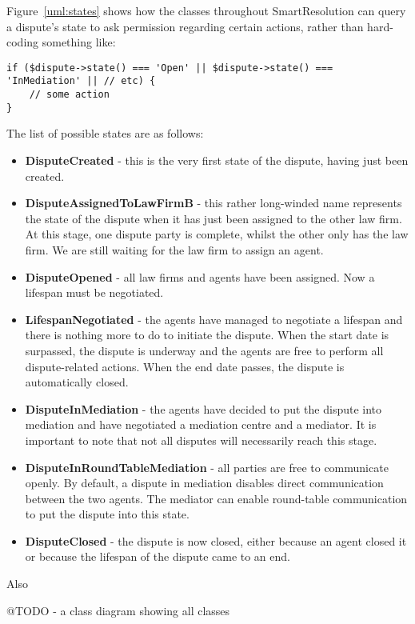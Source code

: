 Figure~\ref{uml:states} shows how the classes throughout SmartResolution can query a dispute's state to ask permission regarding certain actions, rather than hard-coding something like:

\begin{lstlisting}
if ($dispute->state() === 'Open' || $dispute->state() === 'InMediation' || // etc) {
    // some action
}
\end{lstlisting}

The list of possible states are as follows:

\begin{itemize}
    \item \textbf{DisputeCreated} - this is the very first state of the dispute, having just been created.
    \item \textbf{DisputeAssignedToLawFirmB} - this rather long-winded name represents the state of the dispute when it has just been assigned to the other law firm. At this stage, one dispute party is complete, whilst the other only has the law firm. We are still waiting for the law firm to assign an agent.
    \item \textbf{DisputeOpened} - all law firms and agents have been assigned. Now a lifespan must be negotiated.
    \item \textbf{LifespanNegotiated} - the agents have managed to negotiate a lifespan and there is nothing more to do to initiate the dispute. When the start date is surpassed, the dispute is underway and the agents are free to perform all dispute-related actions. When the end date passes, the dispute is automatically closed.
    \item \textbf{DisputeInMediation} - the agents have decided to put the dispute into mediation and have negotiated a mediation centre and a mediator. It is important to note that not all disputes will necessarily reach this stage.
    \item \textbf{DisputeInRoundTableMediation} - all parties are free to communicate openly. By default, a dispute in mediation disables direct communication between the two agents. The mediator can enable round-table communication to put the dispute into this state.
    \item \textbf{DisputeClosed} - the dispute is now closed, either because an agent closed it or because the lifespan of the dispute came to an end.
\end{itemize}


Also

@TODO - a class diagram showing all classes

